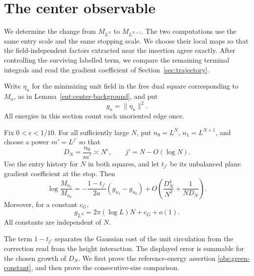 \section{The center observable}\label{sec:observable}

We determine the change from \(M_{L^N}\) to \(M_{L^{N+1}}\).
The two computations use the same entry
scale and the same stopping scale.  We choose their local maps so that
the field-independent factors extracted near the insertion agree
exactly.  After controlling the surviving labelled term, we compare
the remaining terminal integrals and read the gradient coefficient
of Section~\ref{sec:trajectory}.

Write \(\eta_n\) for the minimizing unit field in the free dual square
corresponding to \(M_n\), as in Lemma~\ref{ent:center-background}, and
put
\[
                         g_n=\|\eta_n\|^2.
\]
All energies in this section count each unoriented edge once.

\begin{proposition}\label{obs:consecutive}
Fix \(0<\epsilon<1/10\).  For all sufficiently large \(N\), put
\(n_0=L^N\), \(n_1=L^{N+1}\), and choose a power \(m'=L^{j'}\) so that
\begin{equation}\label{obs:stop}
 D_N=\frac{n_0}{m'}\asymp N^\epsilon,\qquad
 j'=N-O(\log N).
\end{equation}
Use the entry history for \(N\) in both squares, and let \(t_{j'}\)
be its unbalanced plane gradient coefficient at the stop.  Then
\begin{equation}\label{obs:consecutive-formula}
 \log\frac{M_{n_1}}{M_{n_0}}
 =-\frac{1-t_{j'}}{2a}(g_{n_1}-g_{n_0})
   +O\left(\frac{D_N^4}{N^2}+\frac{1}{ND_N}\right).
\end{equation}
Moreover, for a constant \(c_G\),
\begin{equation}\label{obs:green-constant}
                g_{L^N}=2\pi(\log L)N+c_G+o(1).
\end{equation}
All constants are independent of \(N\).
\end{proposition}

The term \(1-t_{j'}\) separates the Gaussian cost of the unit
circulation from the correction read from the height interaction.
The displayed error is summable for the chosen growth of \(D_N\).
We first prove the reference-energy assertion
\eqref{obs:green-constant}, and then prove the consecutive-size
comparison.

